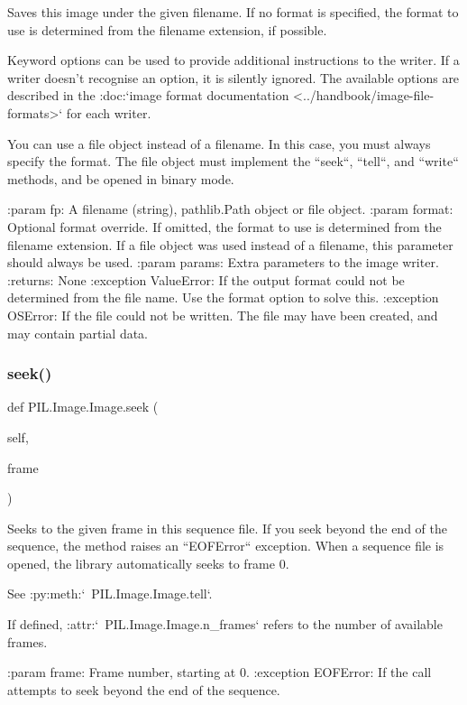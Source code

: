 \begin{DoxyVerb}Saves this image under the given filename.  If no format is
specified, the format to use is determined from the filename
extension, if possible.

Keyword options can be used to provide additional instructions
to the writer. If a writer doesn't recognise an option, it is
silently ignored. The available options are described in the
:doc:`image format documentation
<../handbook/image-file-formats>` for each writer.

You can use a file object instead of a filename. In this case,
you must always specify the format. The file object must
implement the ``seek``, ``tell``, and ``write``
methods, and be opened in binary mode.

:param fp: A filename (string), pathlib.Path object or file object.
:param format: Optional format override.  If omitted, the
   format to use is determined from the filename extension.
   If a file object was used instead of a filename, this
   parameter should always be used.
:param params: Extra parameters to the image writer.
:returns: None
:exception ValueError: If the output format could not be determined
   from the file name.  Use the format option to solve this.
:exception OSError: If the file could not be written.  The file
   may have been created, and may contain partial data.
\end{DoxyVerb}
 \mbox{\label{classPIL_1_1Image_1_1Image_aacafb6c8dc13709cc40aaee406be8fb0}} 
\subsubsection{\texorpdfstring{seek()}{seek()}}
{\footnotesize\ttfamily def P\+I\+L.\+Image.\+Image.\+seek (\begin{DoxyParamCaption}\item[{}]{self,  }\item[{}]{frame }\end{DoxyParamCaption})}

\begin{DoxyVerb}Seeks to the given frame in this sequence file. If you seek
beyond the end of the sequence, the method raises an
``EOFError`` exception. When a sequence file is opened, the
library automatically seeks to frame 0.

See :py:meth:`~PIL.Image.Image.tell`.

If defined, :attr:`~PIL.Image.Image.n_frames` refers to the
number of available frames.

:param frame: Frame number, starting at 0.
:exception EOFError: If the call attempts to seek beyond the end
    of the sequence.
\end{DoxyVerb}
 \mbox{\label{classPIL_1_1Image_1_1Image_ad8a959c859f9180848f9de3b12896749}} 
